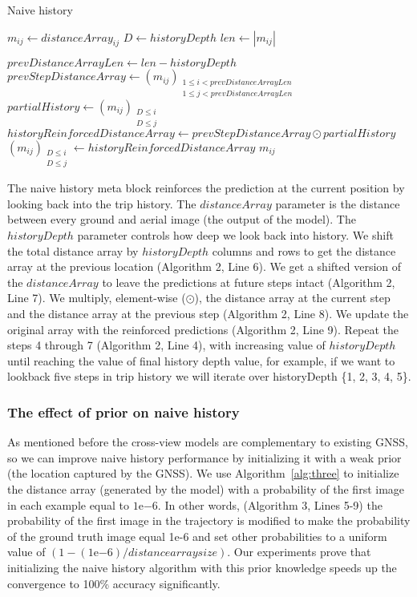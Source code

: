 \documentclass[10pt,letterpaper]{article}
\begin{document}
\begin{algorithm}[H]
  \label{algorithm2}
  \caption{Naive history}\label{alg:two}
  $m_{ij} \gets distanceArray_{ij}$\;
  $D \gets historyDepth$\;
  $len \gets |m_{ij}|$\;
  
   {
      $prevDistanceArrayLen \gets len - historyDepth$\;
      $prevStepDistanceArray \gets (m_{ij})_{\substack{1\le i < prevDistanceArrayLen \\ 1\le j < prevDistanceArrayLen }}$\;
      $partialHistory \gets (m_{ij})_{\substack{D \le i \\ D \le j}}$\;
      $historyReinforcedDistanceArray \gets prevStepDistanceArray \odot partialHistory$\;
      $(m_{ij})_{\substack{D \le i \\ D \le j}} \gets historyReinforcedDistanceArray$\;
  }
  \Return $m_{ij}$\;
\end{algorithm}


The naive history meta block reinforces the prediction at the current position by looking back into the trip history. The $distanceArray$ parameter is the distance between every ground and aerial image (the output of the model).  The $historyDepth$ parameter controls how deep we look back into history. We shift the total distance array by $historyDepth$ columns and rows to get the distance array at the previous location (Algorithm 2, Line 6). We get a shifted version of the $distanceArray$ to leave the predictions at future steps intact (Algorithm 2, Line 7).  We multiply, element-wise ($\odot$), the distance array at the current step and the distance array at the previous step (Algorithm 2, Line 8). We update the original array with the reinforced predictions (Algorithm 2, Line 9). Repeat the steps 4 through 7 (Algorithm 2, Line 4), with increasing value of $historyDepth$ until reaching the value of final history depth value, for example, if we want to lookback five steps in trip history we will iterate over historyDepth  \{1, 2, 3, 4, 5\}.

\subsubsection*{The effect of prior on naive history}
As mentioned before the cross-view models are complementary to existing GNSS, so we can improve naive history performance by initializing it with a weak prior (the location captured by the GNSS).  We use Algorithm~\ref{alg:three} to initialize the distance array (generated by the model) with a probability of the first image in each example equal to $1\mathrm{e}{-6}$. In other words, (Algorithm 3, Lines 5-9) the probability of the first image in the trajectory is modified to make the probability of the ground truth image equal 1e-6 and set other probabilities to a uniform value of $(1 - (1\mathrm{e}{-6}) / distance array size)$. Our experiments prove that initializing the naive history algorithm with this prior knowledge speeds up the convergence to 100\% accuracy significantly.
\end{document}
